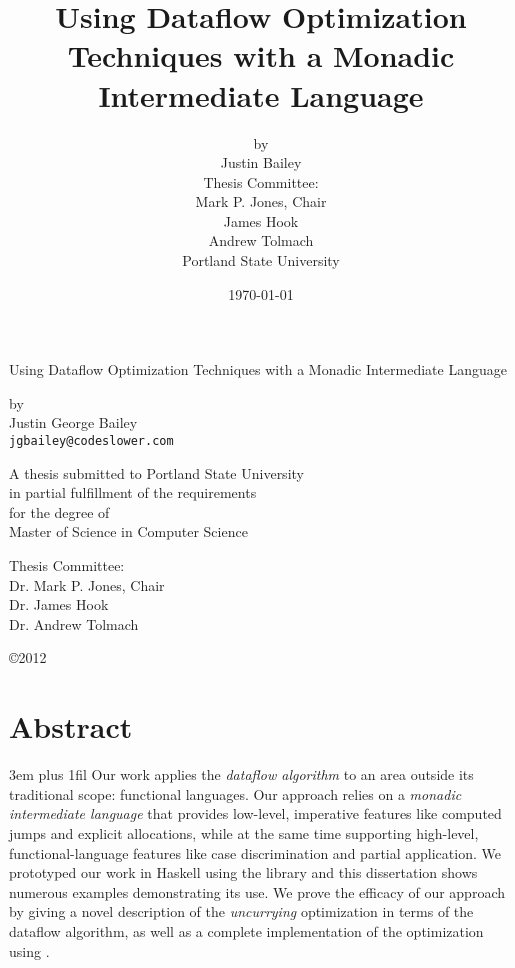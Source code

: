 \dodocclass


\thispagestyle{empty}
\date{\today}
\author{by \\ Justin Bailey \\[24pt] 
               {\normalsize Thesis Committee:} \\
               Mark P. Jones, Chair\\
               James Hook\\
               Andrew Tolmach \\[48pt] 
               Portland State University}
\title{Using Dataflow Optimization Techniques with a Monadic Intermediate Language}
\par\begin{centering}{\Large
Using Dataflow Optimization Techniques with
a Monadic Intermediate Language} \par

by \\
Justin George Bailey\\
\texttt{jgbailey@codeslower.com}\par\vfill

\begin{singlespace}
A thesis submitted to Portland State University \\ 
in partial fulfillment of the requirements \\
for the degree of\\
Master of Science in Computer Science\vfill

Thesis Committee:\\
Dr. Mark P. Jones, Chair\\
Dr. James Hook\\
Dr. Andrew Tolmach\par\vfill

\copyright2012
\end{singlespace}
\end{centering}
\newpage

\pagestyle{plain}
\section*{Abstract}
{%
\parfillskip 3em plus 1fil%
Our work applies the \emph{dataflow algorithm} to an area outside its
traditional scope: functional languages. Our approach relies on
a \emph{monadic intermediate language} that provides low-level,
imperative features like computed jumps and explicit allocations,
while at the same time supporting high-level, functional-language
features like case discrimination and partial application. We
prototyped our work in Haskell using the \hoopl library and this
dissertation shows numerous examples demonstrating its use. We prove
the efficacy of our approach by giving a novel description of
the \emph{uncurrying} optimization in terms of the dataflow algorithm, as
well as a complete implementation of the optimization using \hoopl.\par}
\newpage

